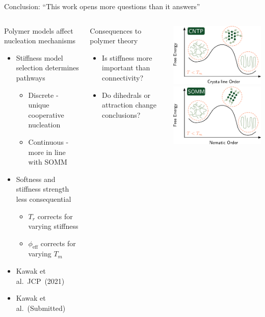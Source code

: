 \documentclass[aspectratio=169]{beamer}
\begin{document}
\begin{frame}[c]{Conclusion: ``This work opens more questions than it answers''}

    \begin{columns}[T, onlytextwidth]

      \vspace{-\baselineskip}
      \begin{block}{Polymer models affect nucleation mechanisms}
        \begin{itemize}
            \item Stiffness model selection determines pathways
          \begin{itemize}
            \item Discrete - unique cooperative nucleation
            \item Continuous - more in line with SOMM
          \end{itemize}
          \item Softness and stiffness strength less consequential
          \begin{itemize}
            \item $T_{r}$ corrects for varying stiffness
            \item $\phi_{\mathrm{eff}}$ corrects for varying $T_{m}$
          \end{itemize}
          \item {\small{}Kawak et al.~JCP~(2021)\par}
          \item {\small{}Kawak et al.~(Submitted) \par}
        \end{itemize}
      \end{block}
      \begin{block}{Consequences to polymer theory}
        \begin{itemize}
          \item Is stiffness more important than connectivity?
          \item Do dihedrals or attraction change conclusions?
        \end{itemize}
      \end{block}

      \centering
      \includegraphics[width=139pt]{../figures/fig-oldnew/fig-CNTP_Free_Energy.pdf}
      \includegraphics[width=139pt]{../figures/fig-oldnew/fig-SOMM_Free_Energy.pdf}


\end{columns}
\end{frame}
\end{document}
